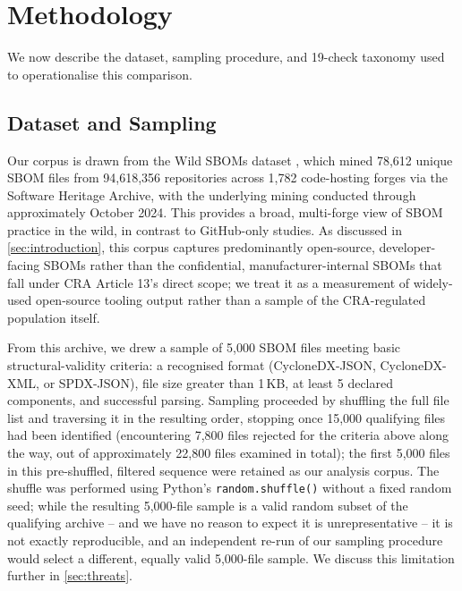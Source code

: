 \documentclass[11pt]{article}
\begin{document}


\section{Methodology}
\label{sec:methodology}

We now describe the dataset, sampling procedure, and 19-check taxonomy used to operationalise this comparison.

\subsection{Dataset and Sampling}
\label{sec:sampling}

Our corpus is drawn from the Wild SBOMs dataset \cite{soeiro2025}, which mined 78,612 unique SBOM files from 94,618,356 repositories across 1,782 code-hosting forges via the Software Heritage Archive, with the underlying mining conducted through approximately October 2024. This provides a broad, multi-forge view of SBOM practice in the wild, in contrast to GitHub-only studies. As discussed in \cref{sec:introduction}, this corpus captures predominantly open-source, developer-facing SBOMs rather than the confidential, manufacturer-internal SBOMs that fall under CRA Article 13's direct scope; we treat it as a measurement of widely-used open-source tooling output rather than a sample of the CRA-regulated population itself.

From this archive, we drew a sample of 5,000 SBOM files meeting basic structural-validity criteria: a recognised format (CycloneDX-JSON, CycloneDX-XML, or SPDX-JSON), file size greater than 1\,KB, at least 5 declared components, and successful parsing. Sampling proceeded by shuffling the full file list and traversing it in the resulting order, stopping once 15,000 qualifying files had been identified (encountering 7,800 files rejected for the criteria above along the way, out of approximately 22,800 files examined in total); the first 5,000 files in this pre-shuffled, filtered sequence were retained as our analysis corpus. The shuffle was performed using Python's \texttt{random.shuffle()} without a fixed random seed; while the resulting 5,000-file sample is a valid random subset of the qualifying archive -- and we have no reason to expect it is unrepresentative -- it is not exactly reproducible, and an independent re-run of our sampling procedure would select a different, equally valid 5,000-file sample. We discuss this limitation further in \cref{sec:threats}.
\end{document}
